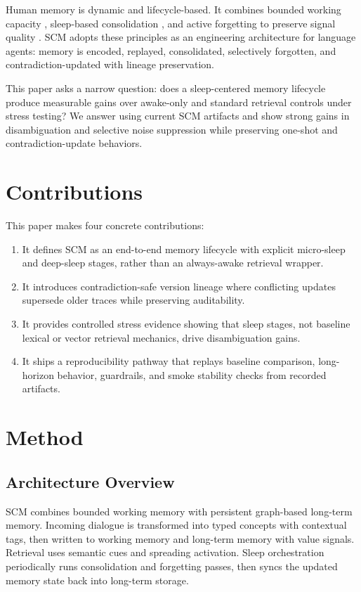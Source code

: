 \documentclass[11pt,a4paper]{article}
\begin{document}
Human memory is dynamic and lifecycle-based. It combines bounded working capacity \cite{miller1956magical}, sleep-based consolidation \cite{rasch2013sleep}, and active forgetting to preserve signal quality \cite{tononi2003sleep}. SCM adopts these principles as an engineering architecture for language agents: memory is encoded, replayed, consolidated, selectively forgotten, and contradiction-updated with lineage preservation.

This paper asks a narrow question: does a sleep-centered memory lifecycle produce measurable gains over awake-only and standard retrieval controls under stress testing? We answer using current SCM artifacts and show strong gains in disambiguation and selective noise suppression while preserving one-shot and contradiction-update behaviors.

\section{Contributions}
This paper makes four concrete contributions:
\begin{enumerate}[leftmargin=1.5em]
    \item It defines SCM as an end-to-end memory lifecycle with explicit micro-sleep and deep-sleep stages, rather than an always-awake retrieval wrapper.
    \item It introduces contradiction-safe version lineage where conflicting updates supersede older traces while preserving auditability.
    \item It provides controlled stress evidence showing that sleep stages, not baseline lexical or vector retrieval mechanics, drive disambiguation gains.
    \item It ships a reproducibility pathway that replays baseline comparison, long-horizon behavior, guardrails, and smoke stability checks from recorded artifacts.
\end{enumerate}

\section{Method}
\subsection{Architecture Overview}
SCM combines bounded working memory with persistent graph-based long-term memory. Incoming dialogue is transformed into typed concepts with contextual tags, then written to working memory and long-term memory with value signals. Retrieval uses semantic cues and spreading activation. Sleep orchestration periodically runs consolidation and forgetting passes, then syncs the updated memory state back into long-term storage.
\end{document}
